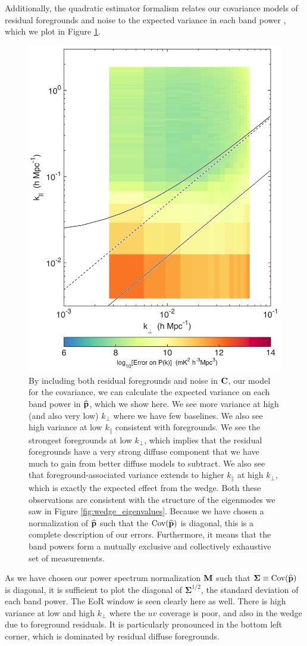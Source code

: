 Additionally, the quadratic estimator formalism relates our covariance models of residual foregrounds and noise to the expected variance in each band power \cite{LT11,DillonFast,X13}, which we plot in Figure \ref{fig:2dError}.
\begin{figure}[] 
	\centering 
	\includegraphics[width=.48\textwidth]{chap4_empirical_covariance/2dError.png}
	\caption[Expected variance on each band power.]{By including both residual foregrounds and noise in $\mathbf{C}$, our model for the covariance, we can calculate the expected variance on each band power in $\widehat{\mathbf{p}}$, which we show here. We see more variance at high (and also very low) $k_\perp$ where we have few baselines. We also see high variance at low $k_\|$ consistent with foregrounds. We see the strongest foregrounds at low $k_\perp$, which implies that the residual foregrounds have a very strong diffuse component that we have much to gain from better diffuse models to subtract. We also see that foreground-associated variance extends to higher $k_\|$ at high $k_\perp$, which is exactly the expected effect from the wedge. Both these observations are consistent with the structure of the eigenmodes we saw in Figure \ref{fig:wedge_eigenvalues}. Because we have chosen a normalization of $\widehat{\mathbf{p}}$ such that the $\text{Cov}(\widehat{\mathbf{p}})$ is diagonal, this is a complete description of our errors. Furthermore, it means that the band powers form a mutually exclusive and collectively exhaustive set of measurements.}
	\label{fig:2dError}
\end{figure}
As we have chosen our power spectrum normalization $\mathbf{M}$ such that $\boldsymbol\Sigma \equiv \text{Cov}(\widehat{\mathbf{p}})$ is diagonal, it is sufficient to plot the diagonal of $\boldsymbol\Sigma^{1/2}$, the standard deviation of each band power. The EoR window is seen clearly here as well. There is high variance at low and high $k_\perp$ where the $uv$ coverage is poor, and also in the wedge due to foreground residuals. It is particularly pronounced in the bottom left corner, which is dominated by residual diffuse foregrounds.

